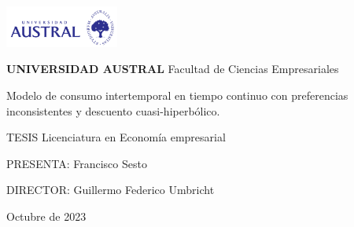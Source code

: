 

\thispagestyle{empty}

\begin {center}

\includegraphics[trim = 1250mm 0mm 0mm 0mm, clip, width=0.28\textwidth]{0_1_Caratula/austral_logo.jpg}

\vspace{0.5cm}
\LARGE\textbf{UNIVERSIDAD AUSTRAL}
\break
\large Facultad de Ciencias Empresariales

\vspace{1.cm}

\large Modelo de consumo intertemporal en tiempo continuo con preferencias inconsistentes y descuento cuasi-hiperbólico.

\vspace{1.cm}
\LARGE TESIS \break
\large  Licenciatura en Economía empresarial

\vspace{0.5cm}

\normalsize PRESENTA: \break
\large Francisco Sesto

\vspace{0.5cm}

\normalsize DIRECTOR: \break
\large Guillermo Federico Umbricht

\vspace{2cm}
Octubre de 2023
\end {center}












